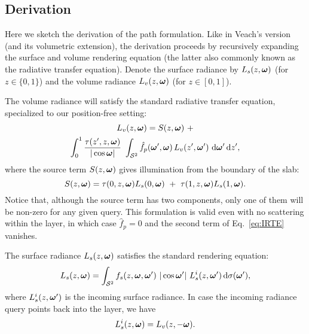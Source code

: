 


\subsection{Derivation}

Here we sketch the derivation of the path formulation.
Like in Veach's version (and its volumetric extension), the derivation proceeds by recursively expanding the surface and volume rendering equation (the latter also commonly known as the radiative transfer equation). Denote the surface radiance by $L_s(z, \bm{\omega})$ (for $z \in \{0, 1\}$) and the volume radiance $L_v(z, \bm{\omega})$ (for $z \in [0,1]$).

The volume radiance will satisfy the standard radiative transfer equation, specialized to our position-free setting:
%
\begin{multline}
\label{eq:IRTE}
L_v(z, \bm{\omega}) = S(z, \bm{\omega}) \ + \\
\int_0^1 \frac{\tau(z', z, \bm{\omega})}{|\cos\bm{\omega}|} \, \, \int_{{\mathcal S^2}} \hat f_p(\bm{\omega}', \bm{\omega}) \, L_v(z', \bm{\omega}') \,\,\mathrm{d} \bm{\omega}' \,\mathrm{d} z',
\end{multline}
%
where the source term $S(z, \bm{\omega})$ gives illumination from the boundary of the slab:
%
\begin{equation}
S(z, \bm{\omega}) = \tau(0, z, \bm{\omega}) L_s(0, \bm{\omega}) \ + \ \tau(1, z, \bm{\omega}) L_s(1, \bm{\omega}).
\end{equation}
%
Notice that, although the source term has two components, only one of them will be non-zero for any given query.
This formulation is valid even with no scattering within the layer, in which case $\hat f_p = 0$ and the second term of Eq.~\eqref{eq:IRTE} vanishes.

The surface radiance $L_s(z, \bm{\omega})$ satisfies the standard rendering equation:
%
\begin{equation}
\label{eq:RE}
L_s(z, \bm{\omega}) = \int_{{\mathcal S^2}} f_s(z, \bm{\omega}, \bm{\omega}') \ |\cos \bm{\omega}'| \ L_s^i(z, \bm{\omega}') \,\mathrm{d} \sigma(\bm{\omega}'),
\end{equation}
where $L_s^i(z, \bm{\omega}')$ is the incoming surface radiance. In case the incoming radiance query points back into the layer, we have
\begin{equation}
\label{eq:incoming}
L_s^i(z, \bm{\omega}) = L_v(z, -\bm{\omega}).
\end{equation}

